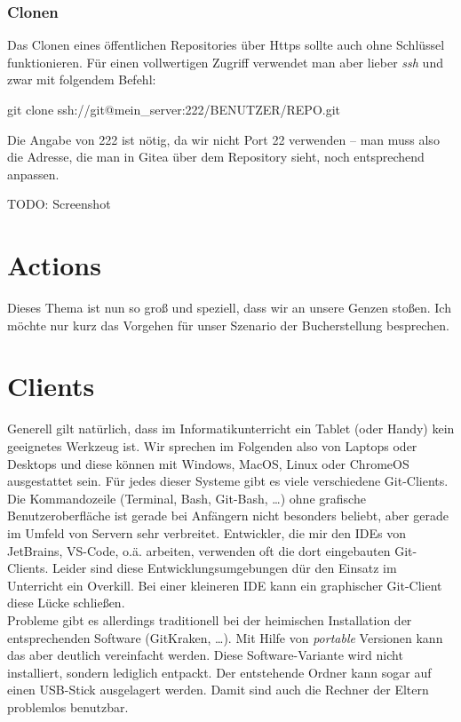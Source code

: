 \documentclass[
  letterpaper,
  DIV=11]{scrreprt}
\newenvironment{Shaded}{\begin{snugshade}}{\end{snugshade}}
\newcommand{\FunctionTok}[1]{\textcolor[rgb]{0.28,0.35,0.67}{#1}}
\newcommand{\NormalTok}[1]{\textcolor[rgb]{0.00,0.23,0.31}{#1}}
\begin{document}
\subsection{Clonen}\label{clonen}

Das Clonen eines öffentlichen Repositories über Https sollte auch ohne
Schlüssel funktionieren. Für einen vollwertigen Zugriff verwendet man
aber lieber \emph{ssh} und zwar mit folgendem Befehl:

\begin{Shaded}
\begin{Highlighting}[]
\FunctionTok{git}\NormalTok{ clone ssh://git@mein\_server:222/BENUTZER/REPO.git}
\end{Highlighting}
\end{Shaded}

Die Angabe von 222 ist nötig, da wir nicht Port 22 verwenden -- man muss
also die Adresse, die man in Gitea über dem Repository sieht, noch
entsprechend anpassen.

TODO: Screenshot


\chapter{Actions}\label{actions}

Dieses Thema ist nun so groß und speziell, dass wir an unsere Genzen
stoßen. Ich möchte nur kurz das Vorgehen für unser Szenario der
Bucherstellung besprechen.


\chapter{Clients}\label{clients}

Generell gilt natürlich, dass im Informatikunterricht ein Tablet (oder
Handy) kein geeignetes Werkzeug ist. Wir sprechen im Folgenden also von
Laptops oder Desktops und diese können mit Windows, MacOS, Linux oder
ChromeOS ausgestattet sein. Für jedes dieser Systeme gibt es viele
verschiedene Git-Clients. Die Kommandozeile (Terminal, Bash, Git-Bash,
\ldots) ohne grafische Benutzeroberfläche ist gerade bei Anfängern nicht
besonders beliebt, aber gerade im Umfeld von Servern sehr verbreitet.
Entwickler, die mir den IDEs von JetBrains, VS-Code, o.ä. arbeiten,
verwenden oft die dort eingebauten Git-Clients. Leider sind diese
Entwicklungsumgebungen dür den Einsatz im Unterricht ein Overkill. Bei
einer kleineren IDE kann ein graphischer Git-Client diese Lücke
schließen.\\
Probleme gibt es allerdings traditionell bei der heimischen Installation
der entsprechenden Software (GitKraken, \ldots). Mit Hilfe von
\emph{portable} Versionen kann das aber deutlich vereinfacht werden.
Diese Software-Variante wird nicht installiert, sondern lediglich
entpackt. Der entstehende Ordner kann sogar auf einen USB-Stick
ausgelagert werden. Damit sind auch die Rechner der Eltern problemlos
benutzbar.
\end{document}
